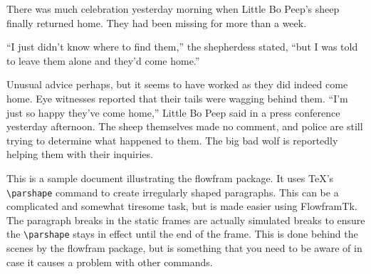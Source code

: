 \documentclass[twoside]{newspaper}
\begin{document}

\noindent
There was much celebration yesterday morning when Little Bo
Peep's sheep finally returned home. They had been missing
for more than a week.

``I just didn't know where to find them,'' the shepherdess
stated, ``but I was told to leave them alone and they'd come
home.'' 

Unusual advice perhaps, but it seems to have worked
as they did indeed come home. Eye witnesses reported that their
tails were wagging behind them.
``I'm just so happy they've come home,'' Little Bo Peep said
in a press conference yesterday afternoon.
The sheep themselves made no comment, and police are
still trying to determine what happened to them.
The big bad wolf is reportedly helping them with their inquiries.

\noindent\hrulefill

This is a sample document illustrating the 
flowfram package. It uses \TeX's \verb|\parshape| command
to create irregularly shaped paragraphs. This can be a complicated
and somewhat tiresome task, but is made easier using FlowframTk.
The paragraph breaks in the static frames are actually
simulated breaks to ensure the \verb|\parshape| stays in effect
until the end of the frame. This is done behind the scenes by
the flowfram package, but is something that you need to be aware
of in case it causes a problem with other commands.
\end{document}
